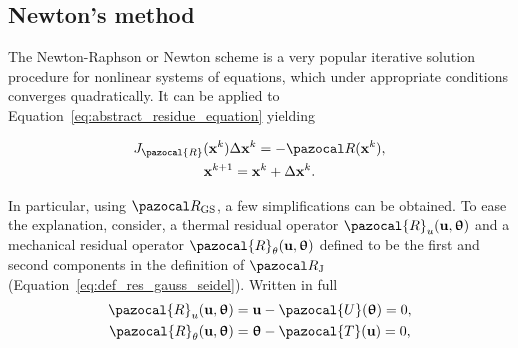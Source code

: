 \subsection{Newton's method}

The Newton-Raphson or Newton scheme is a very popular iterative solution procedure for nonlinear systems of equations, which under appropriate conditions converges quadratically.
It can be applied to Equation~\eqref{eq:abstract_residue_equation} yielding
\begin{highlight}[innertopmargin=-5pt]
  \begin{gather}
    J_\pazocal{R}(\mathbf x^k)\Delta \mathbf x^k = - \pazocal R(\mathbf x^k), \label{eq:newton_system}\\
    \mathbf x^{k+1} = \mathbf x^k + \Delta \mathbf x^k. \label{eq:newton_iter}
  \end{gather}
\end{highlight}

In particular, using \(\pazocal R_\mathrm{GS}\), a few simplifications can be obtained. 
To ease the explanation, consider, a thermal residual operator $\pazocal{R}_{u}(\mathbf{u}, \bm{\uptheta})$ and a mechanical residual operator $\pazocal{R}_{\theta}(\mathbf{u}, \bm{\uptheta})$ defined to be the first and second components in the definition of \(\pazocal R_\mathrm{J}\) (Equation~\eqref{eq:def_res_gauss_seidel}).
Written in full
\begin{gather}
\pazocal{R}_{u}(\mathbf{u}, \bm{\uptheta})=\mathbf{u}-\pazocal{U}(\bm{\uptheta})=0, \\
\pazocal{R}_{\theta}(\mathbf{u}, \bm{\uptheta})=\bm{\uptheta}-\pazocal{T}(\mathbf{u})=0,
\end{gather}

